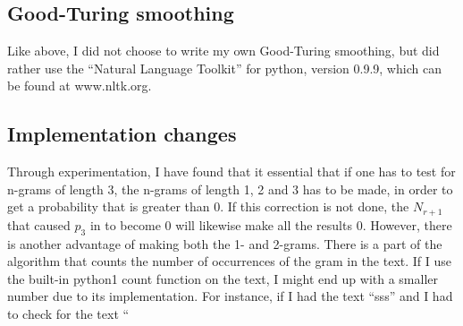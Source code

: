 \subsection{Good-Turing smoothing}
Like above, I did not choose to write my own Good-Turing smoothing, but did rather use the ``Natural Language Toolkit'' for python, version 0.9.9, which can be found at www.nltk.org.

\subsection{Implementation changes}
Through experimentation, I have found that it essential that if one has to test for n-grams of length 3, the n-grams of length 1, 2 and 3 has to be made, in order to get a probability that is greater than 0. If this correction is not done, the $N_{r+1}$ that caused $p_3$ in  to become 0 will likewise make all the results 0. However, there is another advantage of making both the 1- and 2-grams. There is a part of the algorithm that counts the number of occurrences of the gram in the text. If I use the built-in python1 count function on the text, I might end up with a smaller number due to its implementation. For instance, if I had the text ``sss'' and I had to check for the text ``
